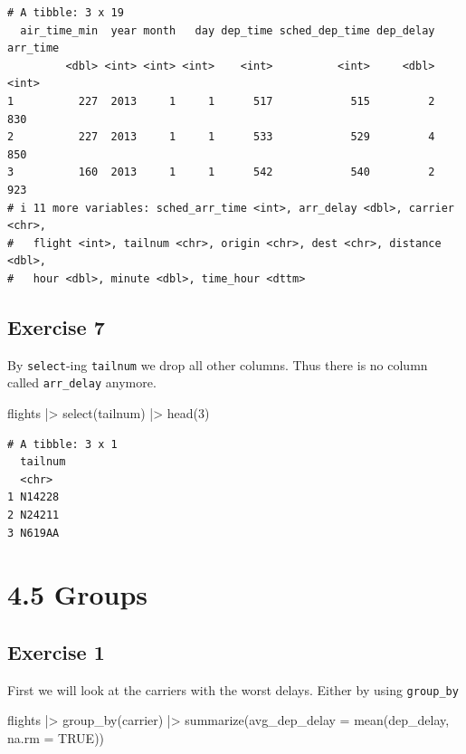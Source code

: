 \documentclass[
  letterpaper,
  DIV=11,
  numbers=noendperiod]{scrreprt}
\newenvironment{Shaded}{\begin{snugshade}}{\end{snugshade}}
\newcommand{\AttributeTok}[1]{\textcolor[rgb]{0.40,0.45,0.13}{#1}}
\newcommand{\ConstantTok}[1]{\textcolor[rgb]{0.56,0.35,0.01}{#1}}
\newcommand{\DecValTok}[1]{\textcolor[rgb]{0.68,0.00,0.00}{#1}}
\newcommand{\FunctionTok}[1]{\textcolor[rgb]{0.28,0.35,0.67}{#1}}
\newcommand{\NormalTok}[1]{\textcolor[rgb]{0.00,0.23,0.31}{#1}}
\newcommand{\SpecialCharTok}[1]{\textcolor[rgb]{0.37,0.37,0.37}{#1}}
\begin{document}
\begin{verbatim}
# A tibble: 3 x 19
  air_time_min  year month   day dep_time sched_dep_time dep_delay arr_time
         <dbl> <int> <int> <int>    <int>          <int>     <dbl>    <int>
1          227  2013     1     1      517            515         2      830
2          227  2013     1     1      533            529         4      850
3          160  2013     1     1      542            540         2      923
# i 11 more variables: sched_arr_time <int>, arr_delay <dbl>, carrier <chr>,
#   flight <int>, tailnum <chr>, origin <chr>, dest <chr>, distance <dbl>,
#   hour <dbl>, minute <dbl>, time_hour <dttm>
\end{verbatim}

\subsection{Exercise 7}\label{exercise-7-2}

By \texttt{select}-ing \texttt{tailnum} we drop all other columns. Thus
there is no column called \texttt{arr\_delay} anymore.

\begin{Shaded}
\begin{Highlighting}[]
\NormalTok{flights }\SpecialCharTok{|\textgreater{}} 
  \FunctionTok{select}\NormalTok{(tailnum) }\SpecialCharTok{|\textgreater{}}
  \FunctionTok{head}\NormalTok{(}\DecValTok{3}\NormalTok{)}
\end{Highlighting}
\end{Shaded}

\begin{verbatim}
# A tibble: 3 x 1
  tailnum
  <chr>  
1 N14228 
2 N24211 
3 N619AA 
\end{verbatim}

\section{4.5 Groups}\label{groups}

\subsection{Exercise 1}\label{exercise-1-12}

First we will look at the carriers with the worst delays. Either by
using \texttt{group\_by}

\begin{Shaded}
\begin{Highlighting}[]
\NormalTok{flights }\SpecialCharTok{|\textgreater{}}
  \FunctionTok{group\_by}\NormalTok{(carrier) }\SpecialCharTok{|\textgreater{}}
  \FunctionTok{summarize}\NormalTok{(}\AttributeTok{avg\_dep\_delay =} \FunctionTok{mean}\NormalTok{(dep\_delay, }\AttributeTok{na.rm =} \ConstantTok{TRUE}\NormalTok{))}
\end{Highlighting}
\end{Shaded}
\end{document}
